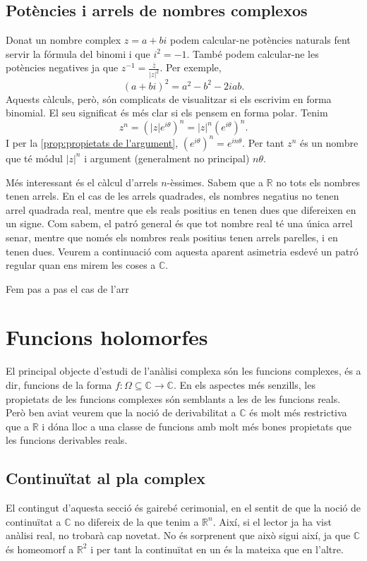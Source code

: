 \documentclass[12pt,twoside]{report}
\numberwithin{table}{section}
\numberwithin{equation}{section}
\numberwithin{figure}{section}
\newcommand{\R}{\ensuremath{\mathbb{R}}}
\newcommand{\C}{\ensuremath{\mathbb{C}}}
\newcommand{\abs}[1]{\left\lvert #1 \right\rvert}
\begin{document}
\section{Potències i arrels de nombres complexos}
Donat un nombre complex \( z = a+bi \) podem calcular-ne potències naturals fent servir la fórmula del binomi i que \( i^2 = -1 \). També podem calcular-ne les potències negatives ja que \( z^{-1} = \frac{\bar{z}}{\abs{z}^2} \). Per exemple, \[ (a + bi)^2 = a^2 - b^2 - 2iab. \] Aquests càlculs, però, són complicats de visualitzar si els escrivim en forma binomial. El seu significat és més clar si els pensem en forma polar. Tenim
\begin{equation*}
	z^n = \left(\abs{z} e^{i\theta}\right)^n = \abs{z}^n (e^{i\theta})^n.
\end{equation*}
I per la \cref{prop:propietats de l'argument}, \( (e^{i\theta})^n = e^{in\theta} \). Per tant \( z^n \) és un nombre que té módul \( \abs{z}^n \) i argument (generalment no principal) \( n\theta \). 

Més interessant és el càlcul d'arrels \( n \)-èssimes. Sabem que a \( \R \) no tots els nombres tenen arrels. En el cas de les arrels quadrades, els nombres negatius no tenen arrel quadrada real, mentre que els reals positius en tenen dues que difereixen en un signe. Com sabem, el patró general és que tot nombre real té una única arrel senar, mentre que només els nombres reals positius tenen arrels parelles, i en tenen dues. Veurem a continuació com aquesta aparent asimetria esdevé un patró regular quan ens mirem les coses a \( \C \). 

Fem pas a pas el cas de l'arr

\chapter{Funcions holomorfes}
El principal objecte d'estudi de l'anàlisi complexa són les funcions complexes, és a dir, funcions de la forma \( f \colon \Omega \subseteq \C \to \C \). En els aspectes més senzills, les propietats de les funcions complexes són semblants a les de les funcions reals. Però ben aviat veurem que la noció de derivabilitat a \( \C \) és molt més restrictiva que a \( \R \) i dóna lloc a una classe de funcions amb molt més bones propietats que les funcions derivables reals.

\section{Continuïtat al pla complex}
El contingut d'aquesta secció és gairebé cerimonial, en el sentit de que la noció de continuïtat a \( \C \) no difereix de la que tenim a \( \R^n \). Així, si el lector ja ha vist anàlisi real, no trobarà cap novetat. No és sorprenent que això sigui així, ja que \( \C \) és homeomorf a \( \R^2 \) i per tant la continuïtat en un és la mateixa que en l'altre. 
\end{document}
